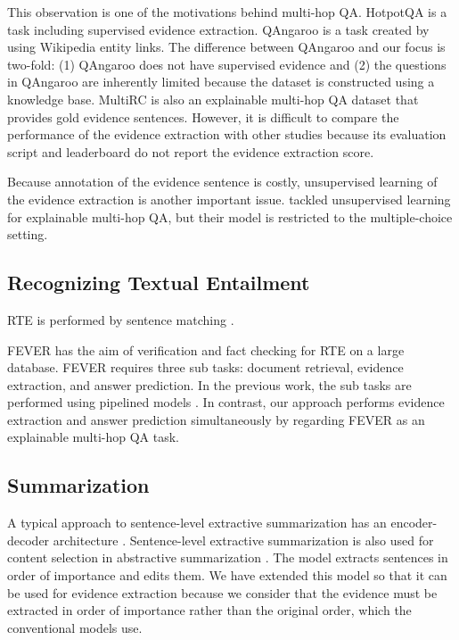 \documentclass[11pt,a4paper]{article}
\theoremstyle{definition}
\begin{document}
	This observation is one of the motivations behind multi-hop QA.
	HotpotQA \cite{hotpot} is a task including supervised evidence extraction. QAngaroo \cite{qangaroo} is a task created by using Wikipedia entity links. The difference between QAngaroo and our focus is two-fold: (1) QAngaroo does not have supervised evidence and (2) the questions in QAngaroo are inherently limited because the dataset is constructed using a knowledge base.
MultiRC \cite{multirc} is also an explainable multi-hop QA dataset that provides gold evidence sentences.
	However, it is difficult to compare the performance of the evidence extraction with other studies because its evaluation script and leaderboard do not report the evidence extraction score.
	
	Because annotation of the evidence sentence is costly, 
	unsupervised learning of the evidence extraction is another important issue.
	\citet{unsupervised_evidence} tackled unsupervised learning for explainable multi-hop QA,
	but their model is restricted to the multiple-choice setting.
	
	\subsection{Recognizing Textual Entailment}
	RTE \cite{snli, mnli} is performed by sentence matching \cite{Rock, esim}.
	
	FEVER \cite{fever} has the aim of verification and fact checking for RTE on a large database. FEVER requires three sub tasks: document retrieval, evidence extraction, and answer prediction. 
	In the previous work, the sub tasks are performed using pipelined models \cite{fever1, fever2}. In contrast, our approach performs evidence extraction and answer prediction simultaneously by regarding FEVER as an explainable multi-hop QA task.

	\subsection{Summarization}
	A typical approach to sentence-level extractive summarization has an encoder-decoder architecture \cite{seq2seq,summarunner,refresh}. 
	Sentence-level extractive summarization is also used for content selection in abstractive summarization \citep{fast}.
	The model extracts sentences in order of importance and edits them.  We have extended this model so that it can be used for evidence extraction because we consider that the evidence must be extracted in order of importance rather than the original order, which the conventional models use.
\end{document}
